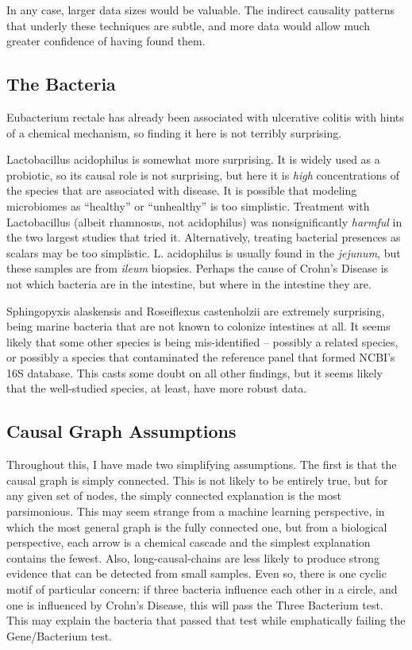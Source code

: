 \documentclass[a4paper]{article}
\begin{document}
In any case, larger data sizes would be valuable.  The indirect
causality patterns that underly these techniques are subtle, and more
data would allow much greater confidence of having found them.

\subsection{The Bacteria}

Eubacterium rectale has
already been associated with ulcerative colitis with hints of a
chemical mechanism\cite{erect}, so finding it here is not terribly
surprising.  

Lactobacillus acidophilus is somewhat more surprising.  It is widely
used as a probiotic, so its causal role is not surprising, but here it
is \textit{high} concentrations of the species that are associated
with disease.  It is possible that modeling microbiomes as ``healthy''
or ``unhealthy'' is too simplistic.  Treatment with Lactobacillus
(albeit rhamnosus, not acidophilus) was nonsignificantly
\textit{harmful} in the two largest studies that tried
it\cite{lgg1,lgg2}.  Alternatively, treating bacterial presences as
scalars may be too simplistic.  L. acidophilus is usually found in the
\textit{jejunum}\cite{lacid}, but these samples are from
\textit{ileum} biopsies.  Perhaps the cause of Crohn's Disease is not
which bacteria are in the intestine, but where in the intestine they
are.

Sphingopyxis alaskensis and Roseiflexus castenholzii are extremely surprising, being marine
bacteria that are not known to colonize intestines at all.  It seems
likely that some other species is being mis-identified -- possibly a
related species, or possibly a species that contaminated the reference
panel that formed NCBI's 16S database.  This casts some doubt on all
other findings, but it seems likely that the well-studied species, at
least, have more robust data.

\subsection{Causal Graph Assumptions}

Throughout this, I have made two simplifying assumptions.  The first
is that the causal graph is simply connected.  This is not likely to
be entirely true, but for any given set of nodes, the simply connected
explanation is the most parsimonious.  This may seem strange from a
machine learning perspective, in which the most general graph is the
fully connected one, but from a biological perspective, each arrow is
a chemical cascade and the simplest explanation contains the fewest.
Also, long-causal-chains are less likely to produce strong evidence
that can be detected from small samples.  Even so, there is one cyclic
motif of particular concern: if three bacteria influence each other in
a circle, and one is influenced by Crohn's Disease, this will pass the
Three Bacterium test.  This may explain the bacteria that passed that
test while emphatically failing the Gene/Bacterium test.
\end{document}
